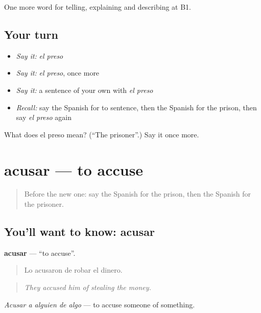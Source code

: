 \begin{grammarlens}[title={What you've built}]
One more word for telling, explaining and describing at B1.
\end{grammarlens}

\subsection*{Your turn}
\begin{itemize}
\raggedright
  \item \emph{Say it:} \emph{el preso}
  \item \emph{Say it:} \emph{el preso}, once more
  \item \emph{Say it:} a sentence of your own with \emph{el preso}
  \item \emph{Recall:} say the Spanish for to sentence, then the Spanish for the prison, then say \emph{el preso} again
\end{itemize}

\begin{tcolorbox}[breakable,colback=teal!4,colframe=teal!35!black,title={Before you move on}]
What does el preso mean? (\textquotedblleft{}The prisoner\textquotedblright{}.) Say it once more.
\end{tcolorbox}
\section[acusar]{acusar — to accuse}

\label{lesson:ES-C523-acusar}



\begin{quote}
Before the new one: say the Spanish for the prison, then the Spanish for the prisoner.
\end{quote}

\subsection*{You'll want to know: acusar}
\textbf{acusar} — \textquotedblleft{}to accuse\textquotedblright{}.

\begin{quote}
Lo acusaron de robar el dinero.
\end{quote}

\begin{quote}
\emph{They accused him of stealing the money.}
\end{quote}

\emph{Acusar a alguien de algo} — to accuse someone of something.

